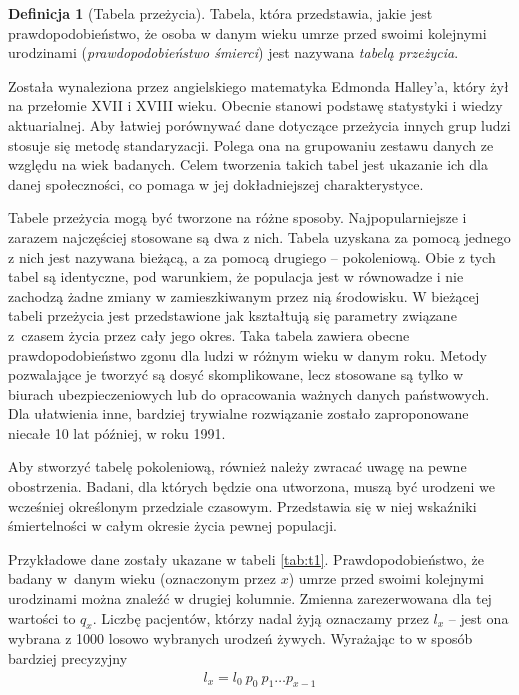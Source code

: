 \documentclass[licencjacka]{pwr_wmat_praca_dyplomowa}
\theoremstyle{plain}
\numberwithin{theorem}{chapter}
\theoremstyle{definition}
\numberwithin{theorem}{chapter}
\newtheorem{definition}[theorem]{Definicja}
\begin{document}
\begin{definition}[Tabela przeżycia]
	Tabela, która przedstawia, jakie jest prawdopodobieństwo, że osoba w danym wieku umrze przed swoimi kolejnymi urodzinami (\textit{prawdopodobieństwo śmierci}) jest nazywana \textit{tabelą przeżycia}.
\end{definition}



Została wynaleziona przez angielskiego matematyka Edmonda Halley'a, który żył na przełomie XVII i XVIII wieku. Obecnie stanowi podstawę statystyki i wiedzy aktuarialnej. Aby łatwiej porównywać dane dotyczące przeżycia innych grup ludzi stosuje się metodę standaryzacji. Polega ona na grupowaniu zestawu danych ze względu na wiek badanych. Celem tworzenia takich tabel jest ukazanie ich dla danej społeczności, co pomaga w jej dokładniejszej charakterystyce. 
 
Tabele przeżycia mogą być tworzone na różne sposoby. Najpopularniejsze i zarazem najczęściej stosowane są dwa z nich. Tabela uzyskana za pomocą jednego z nich jest nazywana bieżącą, a za pomocą drugiego -- pokoleniową. Obie z tych tabel są identyczne, pod warunkiem, że populacja jest w równowadze i nie zachodzą żadne zmiany w zamieszkiwanym przez nią środowisku. W bieżącej tabeli przeżycia jest przedstawione jak kształtują się parametry związane z~czasem życia przez cały jego okres. Taka tabela zawiera obecne prawdopodobieństwo zgonu dla ludzi w różnym wieku w danym roku. Metody pozwalające je tworzyć są dosyć skomplikowane, lecz stosowane są tylko w biurach ubezpieczeniowych lub do opracowania ważnych danych państwowych. Dla ułatwienia inne, bardziej trywialne rozwiązanie zostało zaproponowane niecałe 10 lat później, w roku 1991.

Aby stworzyć tabelę pokoleniową, również należy zwracać uwagę na pewne obostrzenia. Badani, dla których będzie ona utworzona, muszą być urodzeni we wcześniej określonym przedziale czasowym. Przedstawia się w niej wskaźniki śmiertelności w całym okresie życia pewnej populacji.

Przykładowe dane zostały ukazane w tabeli \ref{tab:t1}. Prawdopodobieństwo, że badany w~danym wieku (oznaczonym przez $x$) umrze przed swoimi kolejnymi urodzinami można znaleźć w drugiej kolumnie. Zmienna zarezerwowana dla tej wartości to $q_x$. Liczbę pacjentów, którzy nadal żyją oznaczamy przez $l_x$ -- jest ona wybrana z 1000 losowo wybranych urodzeń żywych. Wyrażając to w sposób bardziej precyzyjny \cite{smimr}
\begin{align}
l_x=l_0 \ p_0 \ p_1\ldots p_{x-1}
\end{align}
\end{document}
